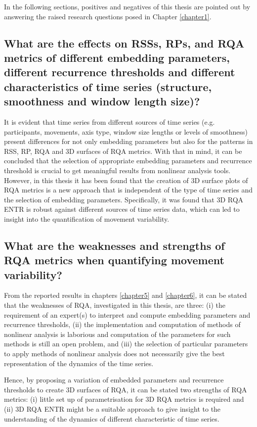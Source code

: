 In the following sections, positives and negatives of this thesis 
are pointed out by answering the raised research questions 
posed in Chapter \ref{chapter1}.

\subsection*{
	What are the effects on RSSs, RPs, and RQA metrics
	of different embedding parameters, different recurrence thresholds 
	and different characteristics of time series 
	(structure, smoothness and window length size)?
}
It is evident that time series from different sources 
of time series (e.g. participants, movements, axis type, window size lengths 
or levels of smoothness) present differences for not only
embedding parameters but also for the patterns in RSS, RP, RQA 
and 3D surfaces of RQA metrics.
With that in mind, it can be concluded that the selection 
of appropriate embedding parameters and recurrence threshold 
is crucial to get meaningful results from nonlinear analysis tools. 
However, in this thesis it has been found that the creation of 
3D surface plots of RQA metrics is a new approach that is 
independent of the type of time series
and the selection of embedding parameters. 
Specifically, it was found that 3D RQA ENTR is robust against 
different sources of time series data, which can led to insight 
into the quantification of movement variability. 

\subsection*{What are the weaknesses and strengths of RQA metrics 
	when quantifying movement variability?
}
From the reported results in chapters 
\ref{chapter5} and \ref{chapter6}, it can be stated that the 
weaknesses of RQA, investigated in this thesis, are three:  
(i) the requirement of an expert(s) 
to interpret and compute embedding parameters and 
recurrence thresholds,  
(ii) the implementation and computation of methods of 
nonlinear analysis is laborious and computation of the parameters 
for such methods is still an open problem, and 
(iii) the selection of particular parameters to apply 
methods of nonlinear analysis does not necessarily give 
the best representation of the dynamics of the time series.

Hence, by proposing a variation of embedded parameters and recurrence 
thresholds to create 3D surfaces of RQA, it can be stated 
two strengths of RQA metrics:  
(i) little set up of parametrisation for 3D RQA metrics is required and 
(ii) 3D RQA ENTR might be a suitable approach to give insight 
to the understanding of the dynamics of different 
characteristic of time series.

